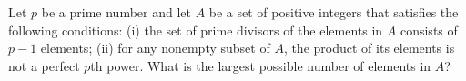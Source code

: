 Let $p$ be a prime number and let $A$ be a set of positive integers that satisfies the following conditions:
(i) the set of prime divisors of the elements in $A$ consists of $p-1$ elements;
(ii) for any nonempty subset of $A$, the product of its elements is not a perfect $p$th power.
What is the largest possible number of elements in $A$?
